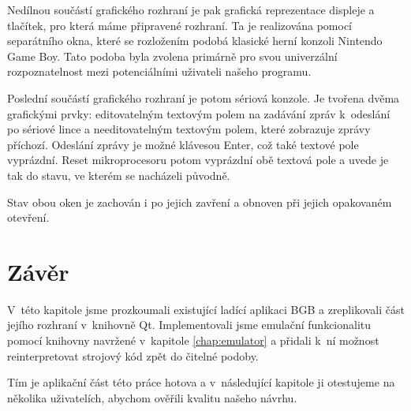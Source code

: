 Nedílnou součástí grafického rozhraní je pak grafická reprezentace displeje a tlačítek, pro která máme připravené rozhraní. Ta je realizována pomocí separátního okna, které se rozložením podobá klasické herní konzoli Nintendo Game Boy. Tato podoba byla zvolena primárně pro svou univerzální rozpoznatelnost mezi potenciálními uživateli našeho programu.


Poslední součástí grafického rozhraní je potom sériová konzole. Je tvořena dvěma grafickými prvky: editovatelným textovým polem na zadávání zpráv k~odeslání po sériové lince a needitovatelným textovým polem, které zobrazuje zprávy příchozí. Odeslání zprávy je možné klávesou Enter, což také textové pole vyprázdní. Reset mikroprocesoru potom vyprázdní obě textová pole a uvede je tak do stavu, ve kterém se nacházeli původně.


Stav obou oken je zachován i po jejich zavření a obnoven při jejich opakovaném otevření.

\section{Závěr}

V~této kapitole jsme prozkoumali existující ladící aplikaci BGB a zreplikovali část jejího rozhraní v~knihovně Qt. Implementovali jsme emulační funkcionalitu pomocí knihovny navržené v~kapitole \ref{chap:emulator} a přidali k~ní možnost reinterpretovat strojový kód zpět do čitelné podoby.

Tím je aplikační část této práce hotova a v~následující kapitole ji otestujeme na několika uživatelích, abychom ověřili kvalitu našeho návrhu.